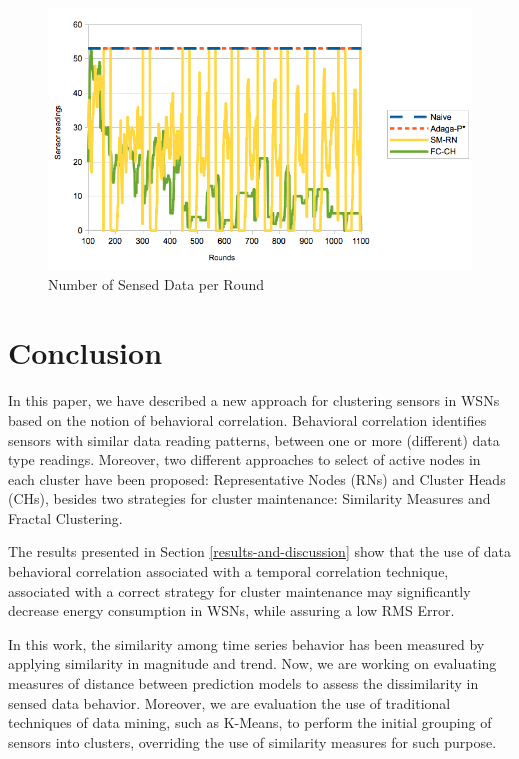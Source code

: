 \documentclass{acm_proc_article-sp}
\begin{document}
\begin{figure}[!htb]
\centering
	\includegraphics[scale=0.35]{WsneeFD_SReadPerRound.png}
    \caption{Number of Sensed Data per Round}
    \label{fig:sens-reading}
\end{figure}


\section{Conclusion}
\label{conclusion}

In this paper, we have described a new approach for clustering sensors in WSNs
based on the notion of behavioral correlation. Behavioral correlation identifies
sensors with similar data reading patterns, between one or more (different) data
type readings. Moreover, two different approaches to select of active nodes in
each cluster have been proposed: Representative Nodes (RNs) and Cluster Heads
(CHs), besides two strategies for cluster maintenance: Similarity
Measures and Fractal Clustering.

The results presented in Section \ref{results-and-discussion} show that the use
of data behavioral correlation associated with a temporal correlation technique,
associated with a correct strategy for cluster maintenance may significantly
decrease energy consumption in WSNs, while assuring a low RMS Error.

In this work, the similarity among time series behavior has been measured by
applying similarity in magnitude and trend. Now, we are working on evaluating
measures of distance between prediction models to assess the dissimilarity in
sensed data behavior. Moreover, we are evaluation the use of traditional
techniques of data mining, such as K-Means, to perform the initial grouping of
sensors into clusters, overriding the use of similarity measures for such
purpose.






  
\end{document}
